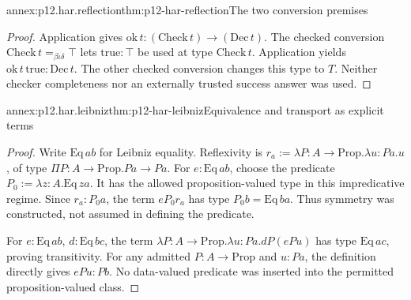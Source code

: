 \begin{annexitem}{annex:p12.har.reflection}{thm:p12-har-reflection}{The two conversion premises}
\begin{proof}
Application gives
\(\mathrm{ok}\,t:(\mathrm{Check}\,t)\to(\mathrm{Dec}\,t)\).
The checked conversion \(\mathrm{Check}\,t=_{\beta\iota\delta}\top\)
lets \(\mathrm{true}:\top\) be used at type
\(\mathrm{Check}\,t\). Application yields
\(\mathrm{ok}\,t\,\mathrm{true}:\mathrm{Dec}\,t\).
The other checked conversion changes this type to \(T\). Neither
checker completeness nor an externally trusted success answer was used.
\end{proof}
\end{annexitem}

\begin{annexitem}{annex:p12.har.leibniz}{thm:p12-har-leibniz}{Equivalence and transport as explicit terms}
\begin{proof}
Write \(\mathrm{Eq}\,a b\) for Leibniz equality. Reflexivity is
\(r_a:=\lambda P:A\to\mathrm{Prop}.\lambda u:Pa.u\), of type
\(\Pi P:A\to\mathrm{Prop}.Pa\to Pa\).
For \(e:\mathrm{Eq}\,a b\), choose the predicate
\(P_0:=\lambda z:A.\mathrm{Eq}\,z a\). It has the allowed
proposition-valued type in this impredicative regime. Since
\(r_a:P_0a\), the term \(eP_0r_a\) has type
\(P_0b=\mathrm{Eq}\,b a\). Thus symmetry was constructed,
not assumed in defining the predicate.

For \(e:\mathrm{Eq}\,a b\), \(d:\mathrm{Eq}\,b c\),
the term \(\lambda P:A\to\mathrm{Prop}.\lambda u:Pa.dP(ePu)\)
has type \(\mathrm{Eq}\,a c\), proving transitivity.
For any admitted \(P:A\to\mathrm{Prop}\) and \(u:Pa\), the
definition directly gives \(ePu:Pb\). No data-valued predicate was
inserted into the permitted proposition-valued class.
\end{proof}
\end{annexitem}

